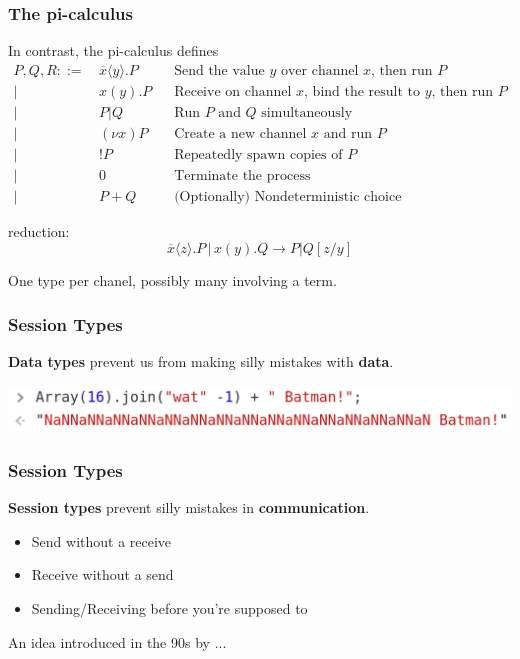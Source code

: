 \documentclass[12pt]{beamer}
\begin{document}
\begin{frame}
\frametitle{The pi-calculus}
In contrast, the pi-calculus defines
\begingroup
\fontsize{10pt}{12pt}\selectfont
\begin{align*}
P, Q, R ::= \, & \overline{x} \langle y \rangle.P \,\,\, \, \, &\text{Send the value }y\text{ over channel }x\text{, then run }P \\
|\,\,\, & x(y).P \,\,\, \, \, & \text{Receive on channel }x\text{, bind the result to }y\text{, then run }P \\
|\,\,\, & P|Q \,\,\, \, \, \, \, \, \, &\text{Run }P\text{ and }Q\text{ simultaneously} \\
|\,\,\, & (\nu x)P  \,\,\, &\text{Create a new channel }x\text{ and run }P \\
|\,\,\, & !P \,\,\, &\text{Repeatedly spawn copies of }P \\
|\,\,\, & 0 & \text{Terminate the process} \\
|\,\,\, & P + Q & \text{(Optionally) Nondeterministic choice}
\end{align*}
\endgroup


reduction: 
$$\overline{x}\langle z \rangle.P\, |\, x(y).Q \rightarrow P | Q[z/y]$$

One type per chanel, possibly many involving a term.

\end{frame}


\begin{frame}[t]
\frametitle{Session Types}

\begin{center}
    \textbf{Data types} prevent us from making silly mistakes with \textbf{data}. \linebreak 

\begin{center}
\includegraphics[scale=0.30]{img/batman.png}
\end{center}

\end{center}




\end{frame}

\begin{frame}[t]
\frametitle{Session Types}
    \textbf{Session types} prevent silly mistakes in \textbf{communication}.  

\begin{itemize}
    \item Send without a receive
    \item Receive without a send
    \item Sending/Receiving before you're supposed to
\end{itemize}

An idea introduced in the 90s by ...

\end{frame}
\end{document}
